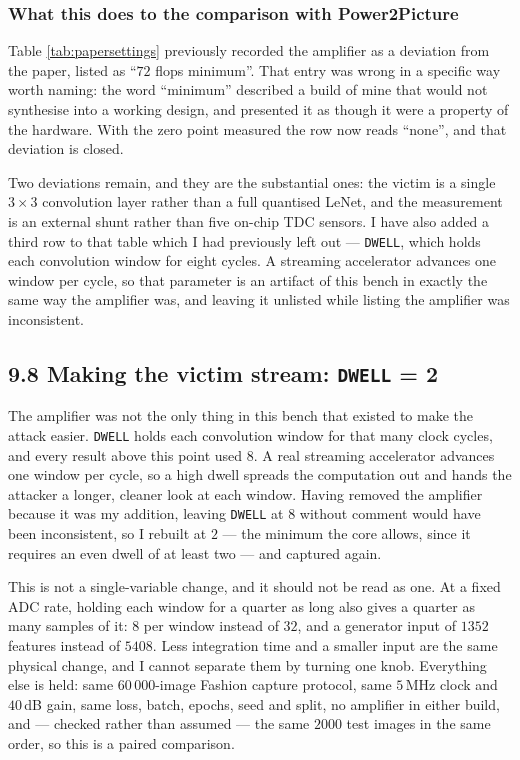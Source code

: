 \documentclass[11pt,a4paper]{article}
\begin{document}
\subsubsection*{What this does to the comparison with Power2Picture}

Table \ref{tab:papersettings} previously recorded the amplifier as a deviation from the
paper, listed as ``$72$ flops minimum''. That entry was wrong in a specific way worth
naming: the word ``minimum'' described a build of mine that would not synthesise into a
working design, and presented it as though it were a property of the hardware. With the
zero point measured the row now reads ``none'', and that deviation is closed.

Two deviations remain, and they are the substantial ones: the victim is a single
$3\times3$ convolution layer rather than a full quantised LeNet, and the measurement is an
external shunt rather than five on-chip TDC sensors. I have also added a third row to that
table which I had previously left out --- \texttt{DWELL}, which holds each convolution
window for eight cycles. A streaming accelerator advances one window per cycle, so that
parameter is an artifact of this bench in exactly the same way the amplifier was, and
leaving it unlisted while listing the amplifier was inconsistent.



\subsection*{9.8 Making the victim stream: \texttt{DWELL} = 2}

The amplifier was not the only thing in this bench that existed to make the attack easier.
\texttt{DWELL} holds each convolution window for that many clock cycles, and every result
above this point used $8$. A real streaming accelerator advances one window per cycle, so
a high dwell spreads the computation out and hands the attacker a longer, cleaner look at
each window. Having removed the amplifier because it was my addition, leaving \texttt{DWELL}
at $8$ without comment would have been inconsistent, so I rebuilt at $2$ --- the minimum
the core allows, since it requires an even dwell of at least two --- and captured again.

This is not a single-variable change, and it should not be read as one. At a fixed ADC
rate, holding each window for a quarter as long also gives a quarter as many samples of
it: $8$ per window instead of $32$, and a generator input of $1352$ features instead of
$5408$. Less integration time and a smaller input are the same physical change, and I
cannot separate them by turning one knob. Everything else is held: same $60\,000$-image
Fashion capture protocol, same $5$\,MHz clock and $40$\,dB gain, same loss, batch, epochs,
seed and split, no amplifier in either build, and --- checked rather than assumed --- the
same $2000$ test images in the same order, so this is a paired comparison.
\end{document}
